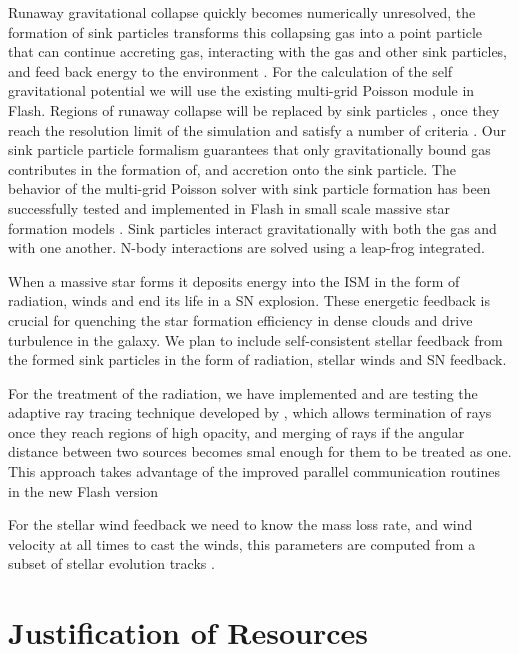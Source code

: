 \documentclass[12pt,a4paper]{article}
\begin{document}
	
Runaway gravitational collapse quickly becomes numerically unresolved, the formation of sink particles transforms this collapsing gas into a point particle that can continue accreting gas, interacting with the gas and other sink particles, and feed back energy to the environment \cite{Bate2009, Dale2014}.
	For the calculation of the self gravitational potential we will use the existing multi-grid Poisson module in Flash.
Regions of runaway collapse will be replaced by sink particles \citep{Bate95}, once they reach the resolution limit of the simulation and satisfy a number of criteria \citep{Federrath2010}.
Our sink particle particle formalism guarantees that only gravitationally bound gas contributes in the formation of, and accretion onto the sink particle.
The behavior of the multi-grid Poisson solver with sink particle formation has been successfully tested and implemented in Flash in small scale massive star formation models \citep{Peters2010}.
Sink particles interact gravitationally with both the gas and with one another.
N-body interactions are solved using a leap-frog integrated.
	
When a massive star forms it deposits energy into the ISM in the form of radiation, winds and end its life in a SN explosion. 
These energetic feedback is crucial for quenching the star formation efficiency in dense clouds and drive turbulence in the galaxy.
We plan to include self-consistent stellar feedback from the formed sink particles in the form of radiation, stellar winds and SN feedback.
	
For the treatment of the radiation, we have implemented and are testing the adaptive ray tracing technique developed by \citet{Wise&Abel2011}, which allows termination of rays once they reach regions of high opacity, and merging of rays if the angular distance between two sources becomes smal enough for them to be treated as one.
This approach takes advantage of the improved parallel communication routines in the new Flash version \citep{FlashPerformance}
	
For the stellar wind feedback we need to know the mass loss rate, and wind velocity at all times to cast the winds, this parameters are computed from a subset of stellar evolution tracks \citet{Ekstrom2012, Georgy2012, Georgy2013}.
	

\section{Justification of Resources}
\end{document}
